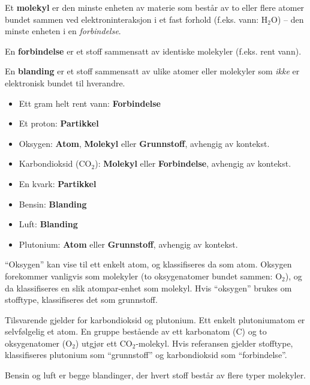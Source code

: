 \vskip 10pt

Et {\bf molekyl} er den minste enheten av materie som består av to eller flere atomer bundet sammen ved elektroninteraksjon i et fast forhold (f.eks. vann: H$_{2}$O) -- den minste enheten i en {\it forbindelse}.

\vskip 10pt

En {\bf forbindelse} er et stoff sammensatt av identiske molekyler (f.eks. rent vann).

\vskip 10pt

En {\bf blanding} er et stoff sammensatt av ulike atomer eller molekyler som {\it ikke} er elektronisk bundet til hverandre.

\vskip 10pt

\begin{itemize}
\item{} Ett gram helt rent vann: {\bf Forbindelse}
\item{} Et proton: {\bf Partikkel}
\item{} Oksygen: {\bf Atom}, {\bf Molekyl} eller {\bf Grunnstoff}, avhengig av kontekst.
\item{} Karbondioksid (CO$_{2}$): {\bf Molekyl} eller {\bf Forbindelse}, avhengig av kontekst.
\item{} En kvark: {\bf Partikkel}
\item{} Bensin: {\bf Blanding}
\item{} Luft: {\bf Blanding}
\item{} Plutonium: {\bf Atom} eller {\bf Grunnstoff}, avhengig av kontekst.
\end{itemize} 

\vskip 10pt

``Oksygen'' kan vise til ett enkelt atom, og klassifiseres da som atom. Oksygen forekommer vanligvis som molekyler (to oksygenatomer bundet sammen: O$_{2}$), og da klassifiseres en slik atompar-enhet som molekyl. Hvis ``oksygen'' brukes om stofftype, klassifiseres det som grunnstoff.

\vskip 10pt

Tilsvarende gjelder for karbondioksid og plutonium. Ett enkelt plutoniumatom er selvfølgelig et atom. En gruppe bestående av ett karbonatom (C) og to oksygenatomer (O$_{2}$) utgjør ett CO$_{2}$-molekyl. Hvis referansen gjelder stofftype, klassifiseres plutonium som ``grunnstoff'' og karbondioksid som ``forbindelse''.

\vskip 10pt

Bensin og luft er begge blandinger, der hvert stoff består av flere typer molekyler.











